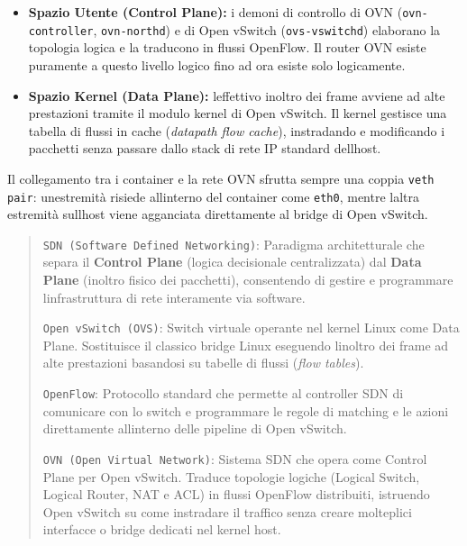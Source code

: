 \begin{itemize}
\tightlist
\item
  \textbf{Spazio Utente (Control Plane):} i demoni di controllo di OVN
  (\passthrough{\lstinline!ovn-controller!},
  \passthrough{\lstinline!ovn-northd!}) e di Open vSwitch
  (\passthrough{\lstinline!ovs-vswitchd!}) elaborano la topologia logica
  e la traducono in flussi OpenFlow. Il router OVN esiste puramente a
  questo livello logico fino ad ora esiste solo logicamente.
\item
  \textbf{Spazio Kernel (Data Plane):} l\textquotesingle effettivo
  inoltro dei frame avviene ad alte prestazioni tramite il modulo kernel
  di Open vSwitch. Il kernel gestisce una tabella di flussi in cache
  (\emph{datapath flow cache}), instradando e modificando i pacchetti
  senza passare dallo stack di rete IP standard
  dell\textquotesingle host.
\end{itemize}

Il collegamento tra i container e la rete OVN sfrutta sempre una coppia
\passthrough{\lstinline!veth pair!}: un\textquotesingle estremità
risiede all\textquotesingle interno del container come
\passthrough{\lstinline!eth0!}, mentre l\textquotesingle altra estremità
sull\textquotesingle host viene agganciata direttamente al bridge di
Open vSwitch.

\begin{quote}
\passthrough{\lstinline!SDN (Software Defined Networking)!}: Paradigma
architetturale che separa il \textbf{Control Plane} (logica decisionale
centralizzata) dal \textbf{Data Plane} (inoltro fisico dei pacchetti),
consentendo di gestire e programmare l\textquotesingle infrastruttura di
rete interamente via software.

\passthrough{\lstinline!Open vSwitch (OVS)!}: Switch virtuale operante
nel kernel Linux come Data Plane. Sostituisce il classico bridge Linux
eseguendo l\textquotesingle inoltro dei frame ad alte prestazioni
basandosi su tabelle di flussi (\emph{flow tables}).

\passthrough{\lstinline!OpenFlow!}: Protocollo standard che permette al
controller SDN di comunicare con lo switch e programmare le regole di
matching e le azioni direttamente all\textquotesingle interno delle
pipeline di Open vSwitch.

\passthrough{\lstinline!OVN (Open Virtual Network)!}: Sistema SDN che
opera come Control Plane per Open vSwitch. Traduce topologie logiche
(Logical Switch, Logical Router, NAT e ACL) in flussi OpenFlow
distribuiti, istruendo Open vSwitch su come instradare il traffico senza
creare molteplici interfacce o bridge dedicati nel kernel host.
\end{quote}

